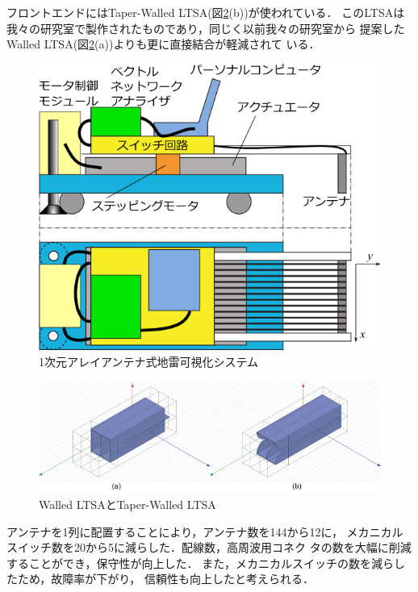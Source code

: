 ﻿\documentclass[12pt,oneside]{jsbook}
\begin{document}
フロントエンドにはTaper-Walled LTSA(図\ref{pic:twltsa}(b))が使われている．
このLTSAは我々の研究室で製作されたものであり，同じく以前我々の研究室から
提案したWalled LTSA(図\ref{pic:twltsa}(a))よりも更に直接結合が軽減されて
いる\cite{2011Nakano}．
\begin{figure}[btp]
 \begin{center}
\includegraphics[width =\hsize ]{so2-2.png}
\caption{1次元アレイアンテナ式地雷可視化システム}
\label{so2}
  \end{center}
\end{figure}
\begin{figure}[btp]
\begin{center}
\includegraphics[width =\hsize]{walled-taper.png}
\caption{Walled LTSAとTaper-Walled LTSA} \label{pic:twltsa} 
\end{center}
\end{figure}
アンテナを1列に配置することにより，アンテナ数を144から12に，
メカニカルスイッチ数を20から5に減らした．配線数，高周波用コネク
タの数を大幅に削減することができ，保守性が向上した．
また，メカニカルスイッチの数を減らしたため，故障率が下がり，
信頼性も向上したと考えられる．
\end{document}
